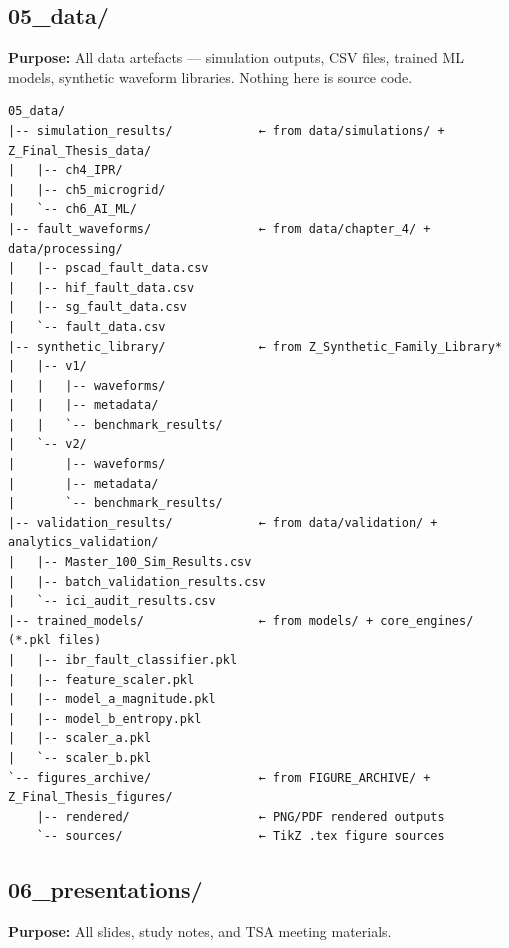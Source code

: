 \documentclass[11pt,a4paper]{article}
\begin{document}
\subsection{05\_data/}

\begin{greenbox}
\textbf{Purpose:} All data artefacts — simulation outputs, CSV files,
trained ML models, synthetic waveform libraries.
Nothing here is source code.
\end{greenbox}

\begin{verbatim}
05_data/
|-- simulation_results/            ← from data/simulations/ + Z_Final_Thesis_data/
|   |-- ch4_IPR/
|   |-- ch5_microgrid/
|   `-- ch6_AI_ML/
|-- fault_waveforms/               ← from data/chapter_4/ + data/processing/
|   |-- pscad_fault_data.csv
|   |-- hif_fault_data.csv
|   |-- sg_fault_data.csv
|   `-- fault_data.csv
|-- synthetic_library/             ← from Z_Synthetic_Family_Library*
|   |-- v1/
|   |   |-- waveforms/
|   |   |-- metadata/
|   |   `-- benchmark_results/
|   `-- v2/
|       |-- waveforms/
|       |-- metadata/
|       `-- benchmark_results/
|-- validation_results/            ← from data/validation/ + analytics_validation/
|   |-- Master_100_Sim_Results.csv
|   |-- batch_validation_results.csv
|   `-- ici_audit_results.csv
|-- trained_models/                ← from models/ + core_engines/ (*.pkl files)
|   |-- ibr_fault_classifier.pkl
|   |-- feature_scaler.pkl
|   |-- model_a_magnitude.pkl
|   |-- model_b_entropy.pkl
|   |-- scaler_a.pkl
|   `-- scaler_b.pkl
`-- figures_archive/               ← from FIGURE_ARCHIVE/ + Z_Final_Thesis_figures/
    |-- rendered/                  ← PNG/PDF rendered outputs
    `-- sources/                   ← TikZ .tex figure sources
\end{verbatim}

\subsection{06\_presentations/}

\begin{greenbox}
\textbf{Purpose:} All slides, study notes, and TSA meeting materials.
\end{greenbox}
\end{document}
